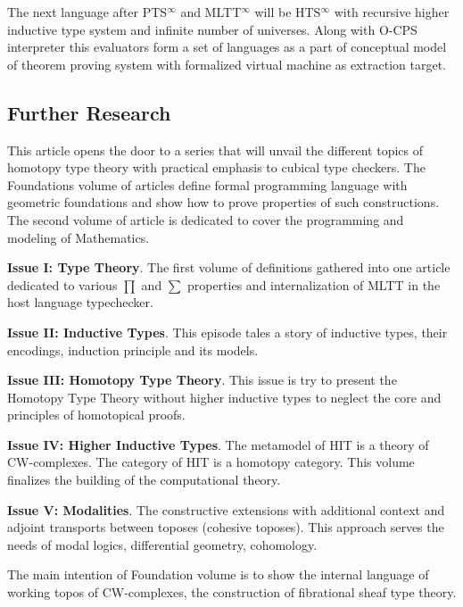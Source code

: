 \documentclass{article}
\theoremstyle{definition}
\begin{document}
The next language after PTS$^{\infty}$ and MLTT$^{\infty}$ will
be HTS$^{\infty}$ with recursive higher inductive type system and infinite number of universes.
Along with O-CPS interpreter this evaluators form a set of languages as a part of conceptual model of theorem
proving system with formalized virtual machine as extraction target.

\subsection*{Further Research}

This article opens the door to a series that will unvail the different topics of
homotopy type theory with practical emphasis to cubical type checkers.
The Foundations volume of articles define formal programming language
with geometric foundations and show how to prove properties of such constructions.
The second volume of article is dedicated to cover the programming and modeling of Mathematics.

{\bf Issue I: Type Theory}.
The first volume of definitions gathered into one article dedicated to
various $\prod$ and $\sum$ properties and internalization of MLTT in the host language typechecker.

{\bf Issue II: Inductive Types}.
This episode tales a story of inductive types, their encodings,
induction principle and its models.

{\bf Issue III: Homotopy Type Theory}.
This issue is try to present the Homotopy Type Theory without higher inductive types
to neglect the core and principles of homotopical proofs.

{\bf Issue IV: Higher Inductive Types}.
The metamodel of HIT is a theory of CW-complexes. The category of HIT is a homotopy category.
This volume finalizes the building of the computational theory.

{\bf Issue V: Modalities}. The constructive extensions with additional context and
adjoint transports between toposes (cohesive toposes). This approach serves the needs
of modal logics, differential geometry, cohomology.

The main intention of Foundation volume is to show the internal language
of working topos of CW-complexes, the construction of fibrational sheaf type theory.

\newpage



\newpage
\end{document}
